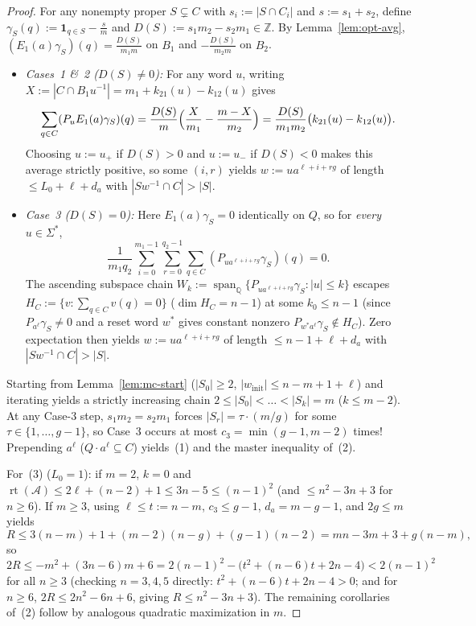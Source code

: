 \documentclass[11pt,a4paper]{article}
\theoremstyle{definition}
\theoremstyle{remark}
\newcommand{\rt}{\operatorname{rt}}
\newcommand{\one}{\mathbf{1}}
\newcommand{\Z}{\mathbb{Z}}
\newcommand{\Q}{\mathbb{Q}}
\newcommand{\cA}{\mathcal{A}}
\begin{document}
\begin{proof}
For any nonempty proper $S \subsetneq C$ with $s_i := |S \cap C_i|$ and $s := s_1 + s_2$, define $\gamma_S(q) := \one_{q \in S} - \frac{s}{m}$ and $D(S) := s_1 m_2 - s_2 m_1 \in \Z$. By Lemma~\ref{lem:opt-avg}, $(E_1(a)\gamma_S)(q) = \frac{D(S)}{m_1 m}$ on $B_1$ and $-\frac{D(S)}{m_2 m}$ on $B_2$.
\begin{itemize}[nosep]
  \item \emph{Cases~1 \&~2 ($D(S) \neq 0$):} For any word $u$, writing $X := |C \cap B_1 u^{-1}| = m_1 + k_{21}(u) - k_{12}(u)$ gives
  \[
    \sum_{q \in C} (P_u E_1(a) \gamma_S)(q) = \frac{D(S)}{m}\Bigl(\frac{X}{m_1} - \frac{m - X}{m_2}\Bigr) = \frac{D(S)}{m_1 m_2}\bigl(k_{21}(u) - k_{12}(u)\bigr).
  \]
  Choosing $u := u_+$ if $D(S) > 0$ and $u := u_-$ if $D(S) < 0$ makes this average strictly positive, so some $(i, r)$ yields $w := u a^{\ell + i + rg}$ of length $\le L_0 + \ell + d_a$ with $|S w^{-1} \cap C| > |S|$.
  \item \emph{Case~3 ($D(S) = 0$):} Here $E_1(a)\gamma_S = 0$ identically on $Q$, so for \emph{every} $u \in \Sigma^*$,
  \[
    \frac{1}{m_1 q_2}\sum_{i=0}^{m_1-1}\sum_{r=0}^{q_2-1}\sum_{q \in C}(P_{u a^{\ell + i + rg}}\gamma_S)(q) = 0.
  \]
  The ascending subspace chain $W_k := \operatorname{span}_\Q\{P_{u a^{\ell + i + rg}}\gamma_S : |u| \le k\}$ escapes $H_C := \{v : \sum_{q \in C} v(q) = 0\}$ ($\dim H_C = n - 1$) at some $k_0 \le n - 1$ (since $P_{a^\ell}\gamma_S \neq 0$ and a reset word $w^*$ gives constant nonzero $P_{w^* a^\ell}\gamma_S \notin H_C$). Zero expectation then yields $w := u a^{\ell + i + rg}$ of length $\le n - 1 + \ell + d_a$ with $|S w^{-1} \cap C| > |S|$.
\end{itemize}
Starting from Lemma~\ref{lem:mc-start} ($|S_0| \ge 2$, $|w_{\mathrm{init}}| \le n - m + 1 + \ell$) and iterating yields a strictly increasing chain $2 \le |S_0| < \dots < |S_k| = m$ ($k \le m - 2$). At any Case-3 step, $s_1 m_2 = s_2 m_1$ forces $|S_r| = \tau \cdot (m/g)$ for some $\tau \in \{1, \dots, g - 1\}$, so Case~3 occurs at most $c_3 = \min(g - 1, m - 2)$ times! Prepending $a^\ell$ ($Q \cdot a^\ell \subseteq C$) yields~(1) and the master inequality of~(2).

For~(3) ($L_0 = 1$): if $m = 2$, $k = 0$ and $\rt(\cA) \le 2\ell + (n-2) + 1 \le 3n - 5 \le (n-1)^2$ (and $\le n^2 - 3n + 3$ for $n \ge 6$). If $m \ge 3$, using $\ell \le t := n - m$, $c_3 \le g - 1$, $d_a = m - g - 1$, and $2g \le m$ yields
\[
  R \le 3(n - m) + 1 + (m - 2)(n - g) + (g - 1)(n - 2) = mn - 3m + 3 + g(n - m),
\]
so $2R \le -m^2 + (3n - 6)m + 6 = 2(n-1)^2 - \bigl(t^2 + (n - 6)t + 2n - 4\bigr) < 2(n-1)^2$ for all $n \ge 3$ (checking $n = 3, 4, 5$ directly: $t^2 + (n-6)t + 2n - 4 > 0$; and for $n \ge 6$, $2R \le 2n^2 - 6n + 6$, giving $R \le n^2 - 3n + 3$). The remaining corollaries of~(2) follow by analogous quadratic maximization in $m$.
\end{proof}
\end{document}
